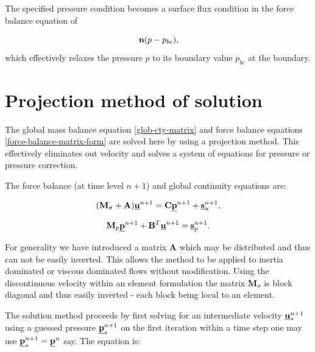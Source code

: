 The specified pressure condition becomes a surface flux 
condition in the force balance equation of 

\begin{equation}
{\bf n} (p-p_{bc}),
\end{equation}
which effectively relaxes the pressure $p$ to its boundary 
value $p_{bc}$ at the boundary. 



\pagebreak
		

\section{Projection method of solution} 
\label{Projection method of solution}

The  
global mass balance equation \ref{glob-cty-matrix} and 
force balance equations \ref{force-balance-matrix-form} are solved here 
by using a projection method. This effectively eliminates 
out velocity and solves a system of equations for 
pressure or pressure correction. 

The force balance (at time level $n+1$) 
and global continuity equations are:

\begin{equation}
({\mathbf M}_\sigma +{\mathbf A}) \underline{\bf u}^{n+1} = {\mathbf C} \underline{\bf p}^{n+1} + \underline{\bf s}_u^{n+1},
\label{force-balance-matrix-form2}
\end{equation}

\begin{equation}
{\mathbf M}_p \underline{\bf p}^{n+1} + {\mathbf B}^T \underline{\bf u}^{n+1} = \underline{\bf s}_p^{n+1}. 
\label{glob-cty-matrix2}
\end{equation}

For generality we have introduced a matrix ${\mathbf A}$ which may be 
distributed and thus can not be easily inverted. 
This allows the method to be applied to inertia dominated 
or viscous dominated flows without modification. 
Using the discontinuous velocity within an element 
formulation the matrix ${\mathbf M}_\sigma$ is block diagonal 
and thus easily inverted - each block being local to an element. 

The solution method proceeds by first solving for 
an intermediate velocity $\underline{\bf u}^{n+1}_*$ using a 
guessed pressure $\underline{\bf p}^{n+1}_*$ on the first iteration 
within a time step one may use $\underline{\bf p}^{n+1}_*=\underline{\bf p}^n$ say. 
The equation is: 

